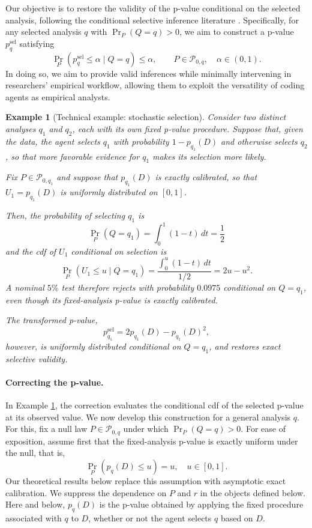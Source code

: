\documentclass[10pt]{article}
\newtheorem{example}{Example}
\begin{document}
Our objective is to restore the validity of the p-value conditional on the selected analysis, following the conditional selective inference literature \citep{fithian2014optimal, tibshirani2016exact, lee2016exact}. Specifically, for any selected analysis $q$ with $\Pr_P\!\left(Q=q\right)>0$, we aim to construct a p-value  $p_q^{\mathrm{sel}}$
satisfying
\[
\Pr_P\!\left(p_q^{\mathrm{sel}}\leq\alpha\mid Q=q\right)
\leq\alpha,
\qquad
P\in\mathcal P_{0,q},\quad \alpha\in(0,1).
\]
In doing so, we aim to provide valid inferences while minimally intervening in researchers' empirical workflow, allowing them to exploit the versatility of coding agents as empirical analysts.

\begin{example}[Technical example: stochastic selection] \label{ex:stochastic_selection}
Consider two distinct analyses $q_1$ and $q_2$, each
with its own fixed p-value procedure. Suppose that, given the data, the agent selects $q_1$ with probability $1-p_{q_1}(D)$ and otherwise selects $q_2$, so that more favorable evidence for $q_1$ makes its selection more likely.

Fix $P\in\mathcal P_{0,q_1}$ and suppose that $p_{q_1}(D)$ is exactly calibrated, so that $U_1=p_{q_1}(D)$ is uniformly distributed on $[0,1]$.

Then, the probability of selecting $q_1$ is
\[
\Pr_P(Q=q_1)=\int_0^1(1-t)\,dt=\frac12
\]
and the cdf of $U_1$ conditional on selection is
\[
\Pr_P(U_1\le u\mid Q=q_1)
=
\frac{\int_0^u(1-t)\,dt}{1/2}
=2u-u^2.
\]
A nominal $5\%$ test therefore rejects with probability
$0.0975$ conditional on $Q=q_1$, even though its
fixed-analysis p-value is exactly calibrated.

The transformed p-value,
\[
p_{q_1}^{\mathrm{sel}}
=
2p_{q_1}(D)-p_{q_1}(D)^2,
\]
however, is uniformly distributed conditional on $Q=q_1$, and restores exact selective validity.
\end{example}

\paragraph{Correcting the p-value.}
In Example \ref{ex:stochastic_selection}, the correction evaluates the conditional cdf of the selected p-value at its observed value. We now develop this construction for a general analysis $q$. For this, fix a null law $P\in\mathcal P_{0,q}$ under which $\Pr_P(Q=q)>0$. For ease of exposition, assume first that the fixed-analysis p-value is exactly uniform under the null, that is,
\[
\Pr_P\!\left(p_q(D)\leq u\right)=u,
\quad u\in[0,1].
\]
Our theoretical results below replace this assumption with asymptotic exact calibration. We suppress the dependence on $P$ and $r$ in the objects defined below. Here and below, $p_q(D)$ is the p-value obtained by applying the fixed procedure associated with $q$ to $D$, whether or not the agent selects $q$ based on $D$.
\end{document}
